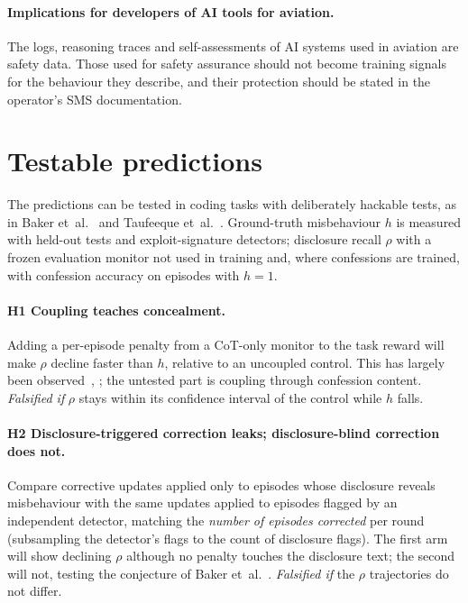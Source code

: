 \documentclass[11pt]{article}
\begin{document}
\paragraph{Implications for developers of AI tools for aviation.} The logs, reasoning traces and self-assessments of AI systems used in aviation are safety data. Those used for safety assurance should not become training signals for the behaviour they describe, and their protection should be stated in the operator's SMS documentation.

\section{Testable predictions}\label{sec:predictions}

The predictions can be tested in coding tasks with deliberately hackable tests, as in Baker et~al.~\cite{baker2025} and Taufeeque et~al.~\cite{taufeeque2026}. Ground-truth misbehaviour \(h\) is measured with held-out tests and exploit-signature detectors; disclosure recall \(\rho\) with a frozen evaluation monitor not used in training and, where confessions are trained, with confession accuracy on episodes with \(h = 1\).

\paragraph{H1 Coupling teaches concealment.} Adding a per-episode penalty from a CoT-only monitor to the task reward will make \(\rho\) decline faster than \(h\), relative to an uncoupled control. This has largely been observed~\cite[Sec.~3.2]{baker2025}, \cite[Sec.~7]{emmons2025}; the untested part is coupling through confession content. \emph{Falsified if} \(\rho\) stays within its confidence interval of the control while \(h\) falls.

\paragraph{H2 Disclosure-triggered correction leaks; disclosure-blind correction does not.} Compare corrective updates applied only to episodes whose disclosure reveals misbehaviour with the same updates applied to episodes flagged by an independent detector, matching the \emph{number of episodes corrected} per round (subsampling the detector's flags to the count of disclosure flags). The first arm will show declining \(\rho\) although no penalty touches the disclosure text; the second will not, testing the conjecture of Baker et~al.~\cite[Sec.~5.2]{baker2025}. \emph{Falsified if} the \(\rho\) trajectories do not differ.
\end{document}
